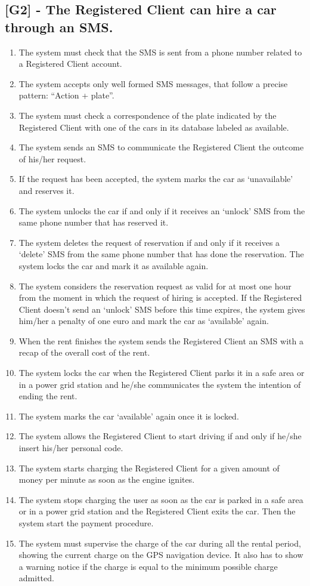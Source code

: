 \subsection{[G2] - The Registered Client can hire a car through an SMS.}
\begin{enumerate}[label=R2.\arabic*]
\item The system must check that the SMS is sent from a phone number related to a Registered Client account.
\item The system accepts only well formed SMS messages, that follow a precise pattern: “Action + plate”.
\item The system must check a correspondence of the plate indicated by the Registered Client with one of the cars in its database labeled as available.
\item The system sends an SMS to communicate the Registered Client the outcome of his/her request.
\item If the request has been accepted, the system marks the car as ‘unavailable’ and reserves it.
\item The system unlocks the car if and only if it receives an ‘unlock’ SMS from  the same phone number that has reserved it.
\item The system deletes the request of reservation if and only if it receives a ‘delete’ SMS from the same phone number that has done the reservation. The system locks the car and mark it as available again.
\item The system considers the reservation request as valid for at most one hour from the moment in which the request of hiring is accepted. If the Registered Client doesn’t send an ‘unlock’ SMS before this time expires, the system gives him/her a penalty of one euro and mark the car as ‘available’ again.
\item When the rent finishes the system sends the Registered Client an SMS with a recap of the overall cost of the rent.
\item The system locks the car when the Registered Client parks it in a safe area or in a power grid station and he/she communicates the system the intention of ending the rent.
\item The system marks the car ‘available’ again once it is locked.
\item The system allows the Registered Client to start driving if and only if he/she insert his/her personal code.
\item The system starts charging the Registered Client for a given amount of money per minute as soon as the engine ignites.
\item The system stops charging the user as soon as the car is parked in a safe area or in a power grid station and the Registered Client exits the car. Then the system start the payment procedure.
\item The system must supervise the charge of the car during all the rental period, showing the current charge on the GPS navigation device. It also has to show a warning notice if the charge is equal to the minimum possible charge admitted.
\end{enumerate}

